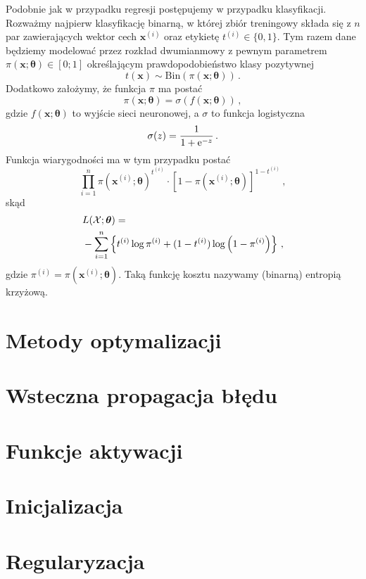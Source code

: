 \documentclass{myclass}
\begin{document}
Podobnie jak w przypadku regresji postępujemy w przypadku klasyfikacji. Rozważmy najpierw
klasyfikację binarną, w której zbiór treningowy składa się z \(n\) par zawierających wektor cech
\(\bm{x}^{(i)}\) oraz etykietę \(t^{(i)} \in \{0,1\}\). Tym razem dane będziemy modelować przez rozkład
dwumianmowy z pewnym parametrem \(\pi(\bm{x}; \bm{\theta}) \in [0;1]\) określającym
prawdopodobieństwo klasy pozytywnej
\[
    t(\bm{x}) \sim \text{Bin}\left(\pi(\bm{x}; \bm{\theta})\right)\,.
\]
Dodatkowo założymy, że funkcja \(\pi\) ma postać
\[
    \pi(\bm{x}; \bm{\theta}) = \sigma\left( f(\bm{x}; \bm{\theta})\right)\,,
\]
gdzie \(f(\bm{x}; \bm{\theta})\) to wyjście sieci neuronowej, a \(\sigma\) to funkcja logistyczna
\[
    \sigma(z) = \frac{1}{1 + \mathrm{e}^{-z}}\,.
\]
Funkcja wiarygodności ma w tym przypadku postać
\[
    \prod_{i=1}^n \pi\left(\bm{x}^{(i)}; \bm{\theta}\right)^{t^{(i)}}\cdot \left[1 - \pi\left(\bm{x}^{(i)}; \bm{\theta}\right)\right]^{1 - t^{(i)}}\,,
\]
skąd
\[
\begin{split}
    &L(\mathcal{X}; \bm{\theta}) =\\
    &- \sum_{i=1}^n \left\{ t^{(i)} \log \pi^{(i)} + (1 - t^{(i)}) \log \left(1 - \pi^{(i)}\right) \right\}\,,
\end{split}
\]
gdzie \(\pi^{(i)} = \pi(\bm{x}^{(i)};\bm{\theta})\). Taką funkcję kosztu nazywamy (binarną) entropią
krzyżową.


\section{Metody optymalizacji}
\section{Wsteczna propagacja błędu}
\section{Funkcje aktywacji}
\section{Inicjalizacja}
\section{Regularyzacja}


\end{document}
